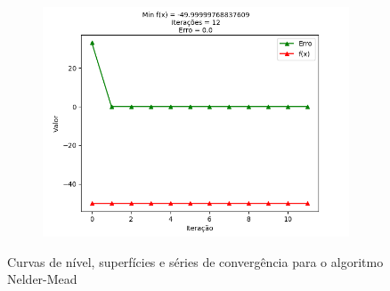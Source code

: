 \documentclass[a4paper, 12pt]{article}
\begin{document}
\begin{figure}[H]
\begin{subfigure}{0.3\textwidth}
  \includegraphics[width=\linewidth]{5/MPFE/A/Nelder-Mead/convergencia.png}
\end{subfigure}
\caption{Curvas de nível, superfícies e séries de convergência para o algoritmo Nelder-Mead}
\label{fig:Q5ANelder-Mead}
\end{figure}
\end{document}
